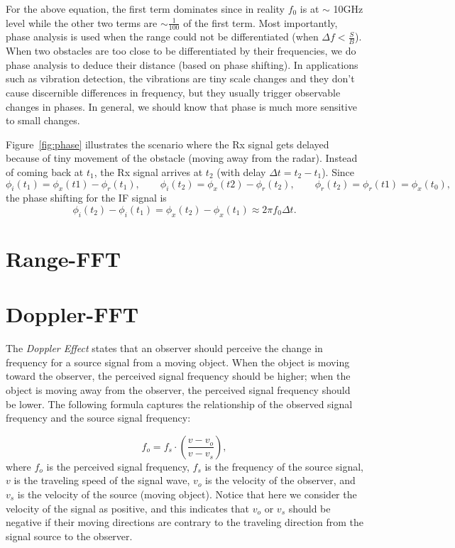 \documentclass[11pt, oneside]{article}   	%
\begin{document}
For the above equation, the first term dominates since in reality $f_0$ is at $\sim$ 10GHz level while the other two terms are $\sim \frac{1}{100}$ of the first term. Most importantly, phase analysis is used when the range could not be differentiated (when $\Delta f < \frac{S}{B}$). When two obstacles are too close to be differentiated by their frequencies, we do phase analysis to deduce their distance (based on  phase shifting). In applications such as vibration detection, the vibrations are tiny scale changes and they don't cause discernible differences in frequency, but they usually trigger observable changes in phases. In general, we should know that phase is much more sensitive to small changes.

Figure~\ref{fig:phase} illustrates the scenario where the Rx signal gets delayed because of tiny movement of the obstacle (moving away from the radar). Instead of coming back at $t_1$, the Rx signal arrives at $t_2$ (with delay $\Delta t = t_2 - t_1$).  Since
$$\phi_i(t_1) = \phi_x(t1) - \phi_r(t_1), \qquad \phi_i(t_2) = \phi_x(t2) - \phi_r(t_2), \qquad \phi_r(t_2) = \phi_r(t1) = \phi_x(t_0),$$
the phase shifting for the IF signal is
$$\phi_i(t_2)-\phi_i(t_1) = \phi_x(t_2) - \phi_x(t_1) \approx 2\pi f_0 \Delta t.$$

\section{Range-FFT}
\section{Doppler-FFT}
The \emph{Doppler Effect} states that an observer should perceive the change in frequency for a source signal from a moving object. When the object is moving toward the observer, the perceived signal frequency should be higher; when the object is moving away from the observer, the perceived signal frequency should be lower. The following formula captures the relationship of the observed signal frequency and the source signal frequency:


$$f_o = f_s \cdot \left(\frac{v - v_o}{v - v_s}\right), $$
where $f_o$ is the perceived signal frequency, $f_s$ is the frequency of the source signal, $v$ is the traveling speed of the signal wave, $v_o$ is the velocity of the observer, and $v_s$ is the velocity of the source (moving object). Notice that here we consider the velocity of the signal as positive, and this indicates that $v_o$ or $v_s$ should be negative if their moving directions are contrary to the traveling direction from the signal source to the observer.
\end{document}
